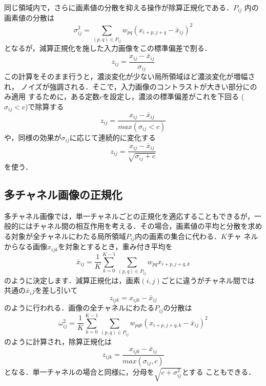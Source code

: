 \documentclass[a4paper,10pt]{jsarticle}
\begin{document}
同じ領域内で，さらに画素値の分散を抑える操作が除算正規化である．$P_{ij}$
内の画素値の分散は
\begin{equation}
 \sigma^2_{ij}=\sum_{(p,q)\in{P_{ij}}}^{} w_{pq}(x_{i+p,j+q}-\bar{x}_{ij})^2
\end{equation}
となるが，減算正規化を施した入力画像をこの標準偏差で割る．
\begin{equation}
 z_{ij}=\frac{x_{ij}-\bar{x}_{ij}}{\sigma_{ij}}
\end{equation}
この計算をそのまま行うと，濃淡変化が少ない局所領域ほど濃淡変化が増幅され，
ノイズが強調される．そこで，入力画像のコントラストが大きい部分にのみ適用
するために，ある定数$c$を設定し，濃淡の標準偏差がこれを下回る
($\sigma_{ij}<c$)で除算する
\begin{equation}
 z_{ij}=\frac{x_{ij}-\bar{x}_{ij}}{max(\sigma_{ij}<c)}
\end{equation}
や，同様の効果が$\sigma_{ij}$に応じて連続的に変化する
\begin{equation}
 z_{ij}=\frac{x_{ij}-\bar{x}_{ij}}{\sqrt{\sigma_{ij}+c}}
\end{equation}
を使う．%

\subsection{多チャネル画像の正規化}
多チャネル画像では，単一チャネルごとの正規化を適応することもできるが，一
般的にはチャネル間の相互作用を考える．その場合，画素値の平均と分散を求め
る対象が全チャネルにわたる局所領域$P_{ij}$内の画素の集合に代わる．$K$チャ
ネルからなる画像$x_{ijk}$を対象とするとき，重み付き平均を
\begin{equation}
 \bar{x}_{ij}=\frac{1}{K}\sum_{k=0}^{K-1}\sum_{(p,q)\in{P_{ij}}}^{} w_{pq}x_{i+p,j+q,k}
\end{equation}
のように決定します．減算正規化は，画素$(i,j)$ごとに違うがチャネル間では
共通の$\bar{x}_ij$を差し引いて
\begin{equation}
 z_{ijk}=x_{ijk}-\bar{x}_{ij}
\end{equation}
のように行われる．画像の全チャネルにわたる$P_{ij}$の分散は
\begin{equation}
  \omega^2_{ij}=\frac{1}{K}\sum_{k=0}^{K-1}\sum_{(p,q)\in{P_{ij}}}^{} w_{pqk}(x_{i+p,j+q,k}-\bar{x}_{ij})^2
\end{equation}
のように計算され，除算正規化は
\begin{equation}
  z_{ijk}=\frac{x_{ijk}-\bar{x}_{ij}}{max(\sigma_{ij},c)}
\end{equation}
となる．単一チャネルの場合と同様に，分母を$\sqrt{c+\sigma^2_{ij}}$とする
こともできる．
\end{document}
